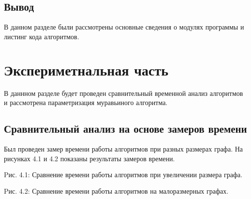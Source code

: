 \documentclass[12pt]{report}
\begin{document}
\section*{Вывод}
В данном разделе были рассмотрены основные сведения о модулях программы и листинг кода алгоритмов.




\chapter{Экспериметнальная часть}
В даннном разделе будет проведен сравнительный временной анализ алгоритмов и рассмотрена параметризация муравьиного алгоритма.

\section{Сравнительный анализ на основе замеров времени}
Был проведен замер времени работы алгоритмов при разных размерах графа. На рисунках 4.1 и 4.2 показаны результаты замеров времени.


\begin{center}
Pис. 4.1: Сравнение времени работы алгоритмов при увеличении размера графа.
\end{center}

\begin{center}
Pис. 4.2: Сравнение времени работы алгоритмов на малоразмерных графах.
\end{center}
\end{document}
